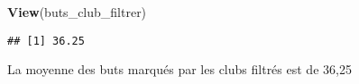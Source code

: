 \documentclass[
]{article}
\newenvironment{Shaded}{\begin{snugshade}}{\end{snugshade}}
\newcommand{\CommentTok}[1]{\textcolor[rgb]{0.56,0.35,0.01}{\textit{#1}}}
\newcommand{\FunctionTok}[1]{\textcolor[rgb]{0.13,0.29,0.53}{\textbf{#1}}}
\newcommand{\NormalTok}[1]{#1}
\newcommand{\OtherTok}[1]{\textcolor[rgb]{0.56,0.35,0.01}{#1}}
\newcommand{\SpecialCharTok}[1]{\textcolor[rgb]{0.81,0.36,0.00}{\textbf{#1}}}
\begin{document}
\begin{Shaded}
\begin{Highlighting}[]
\FunctionTok{View}\NormalTok{(buts\_club\_filtrer)}
\end{Highlighting}
\end{Shaded}

\begin{Shaded}
\end{Shaded}

\begin{verbatim}
## [1] 36.25
\end{verbatim}

La moyenne des buts marqués par les clubs filtrés est de 36,25
\end{document}
